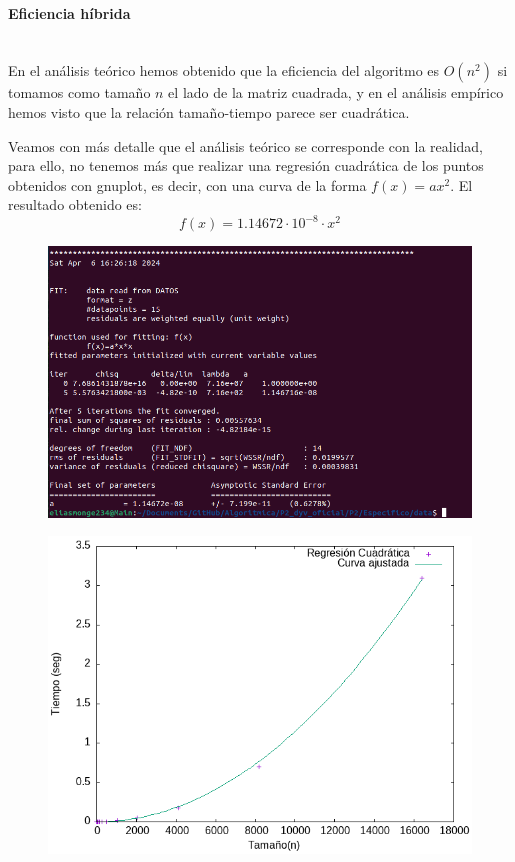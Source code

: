 \documentclass{article}
\newcommand{\myparagraph}[1]{\paragraph{#1}\mbox{}\\}
\begin{document}
\myparagraph{Eficiencia híbrida}

    En el análisis teórico hemos obtenido que la eficiencia del algoritmo
    es $O(n^2)$ si tomamos como tamaño $n$ el lado de la matriz cuadrada, y en
    el análisis empírico hemos visto que la relación tamaño-tiempo parece
    ser cuadrática.

    Veamos con más detalle que el análisis teórico se corresponde con la realidad,
    para ello, no tenemos más que realizar una regresión cuadrática de los puntos
    obtenidos con gnuplot, es decir, con una curva de la forma $f(x) = ax^2$. El
    resultado obtenido es:
\[
    f(x) = 1.14672 \cdot 10^{-8} \cdot x^2
\]
    \begin{figure}[H]
        \centering
        \includegraphics[scale=0.4]{P2/regresion_log.png} 
    \end{figure}

    \begin{figure}[H]
        \centering
        \includegraphics[scale=0.6]{P2/regresion.png} 
    \end{figure}
\end{document}

